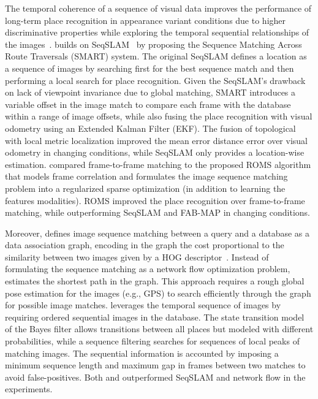 The temporal coherence of a sequence of visual data improves the performance of long-term place recognition in appearance variant conditions due to higher discriminative properties while exploring the temporal sequential relationships of the images~\parencite{ouerghi-et-al:2018:s18040939,nguyen-et-al:2013:004}.
\cite{ouerghi-et-al:2018:s18040939} builds on SeqSLAM~\parencite{discussion:seqslam} by proposing the Sequence Matching Across Route Traversals (SMART) system. The original SeqSLAM defines a location as a sequence of images by searching first for the best sequence match and then performing a local search for place recognition. Given the SeqSLAM's drawback on lack of viewpoint invariance due to global matching, SMART introduces a variable offset in the image match to compare each frame with the database within a range of image offsets, while also fusing the place recognition with visual odometry using an Extended Kalman Filter (EKF). The fusion of topological with local metric localization improved the mean error distance error over visual odometry in changing conditions, while SeqSLAM only provides a location-wise estimation.
\cite{han-et-al:2018:3} compared frame-to-frame matching to the proposed ROMS algorithm that models frame correlation and formulates the image sequence matching problem into a regularized sparse optimization (in addition to learning the features modalities). ROMS improved the place recognition over frame-to-frame matching, while outperforming SeqSLAM and FAB-MAP in changing conditions.

Moreover, \cite{vysotska-et-al:2015:7139576} defines image sequence matching between a query and a database as a data association graph, encoding in the graph the cost proportional to the similarity between two images given by a HOG descriptor~\parencite{naseer-et-al:2015:7324181}. Instead of formulating the sequence matching as a network flow optimization problem, \cite{vysotska-et-al:2015:7139576} estimates the shortest path in the graph. This approach requires a rough global pose estimation for the images (e.g., GPS) to search efficiently through the graph for possible image matches.
\cite{naseer-et-al:2015:7324181} leverages the temporal sequence of images by requiring ordered sequential images in the database. The state transition model of the Bayes filter allows transitions between all places but modeled with different probabilities, while a sequence filtering searches for sequences of local peaks of matching images. The sequential information is accounted by imposing a minimum sequence length and maximum gap in frames between two matches to avoid false-positives.
Both \cite{vysotska-et-al:2015:7139576} and \cite{naseer-et-al:2015:7324181} outperformed SeqSLAM and network flow in the experiments.

